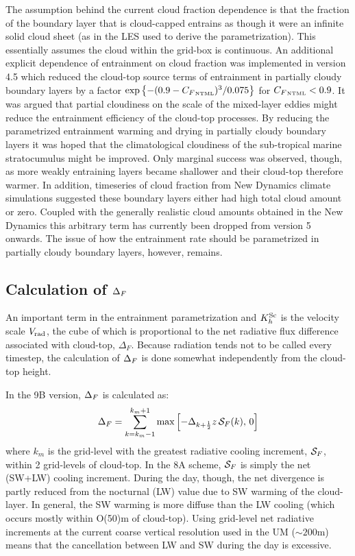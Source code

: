 \documentclass{UMDP_article}
\begin{document}
The assumption behind the current cloud fraction dependence is that
the fraction of the boundary layer that is cloud-capped entrains as
though it were an infinite solid cloud sheet (as in the LES used to
derive the parametrization).  This essentially assumes the cloud
within the grid-box is continuous.  An additional explicit dependence
of entrainment on cloud fraction was implemented in version 4.5 which
reduced the cloud-top source terms of entrainment in partially cloudy
boundary layers by a factor
$\exp{\left\{-(0.9-{C_F}_{\mbox{\tiny \rm NTML}})^3/0.075\right\}}$ for $
{C_F}_{\mbox{\tiny \rm NTML}} < 0.9$.  It was argued that partial cloudiness on the
scale of the mixed-layer eddies might reduce the entrainment
efficiency of the cloud-top processes.  By reducing the parametrized
entrainment warming and drying in partially cloudy boundary layers it
was hoped that the climatological cloudiness of the sub-tropical
marine stratocumulus might be improved.  Only marginal success was
observed, though, as more weakly entraining layers became shallower
and their cloud-top therefore warmer.  In addition, timeseries of
cloud fraction from New Dynamics climate simulations suggested these
boundary layers either had high total cloud amount or zero.  Coupled
with the generally realistic cloud amounts obtained in the New
Dynamics this arbitrary term has currently been dropped from version 5
onwards.  The issue of how the entrainment rate should be parametrized
in partially cloudy boundary layers, however, remains.

\subsection{Calculation of $\Delta_F$}
\label{app:deltaf}

An important term in the entrainment parametrization and $K_h^{\rm Sc}$ is
the velocity scale $V_{\rm rad}$, the cube of which is proportional to the
net radiative flux difference associated with cloud-top, $\Delta_F$.
Because radiation tends not to be called every timestep, the
calculation of $\Delta_F$ is done somewhat independently from the
cloud-top height.

In the 9B version, $\Delta_F$ is calculated as:
\begin{equation}
  \Delta_F = \sum_{k=k_m-1}^{k_m+1} \mbox{max}\left[ 
    - \Delta_{k+\frac{1}{2}} z \, {\cal S}_F(k), \,0 \right]
  \label{ctraddiv}
\end{equation}
where $k_m$ is the grid-level with the greatest radiative cooling
increment, ${\cal S}_F$, within 2 grid-levels of cloud-top.  In
the 8A scheme, ${\cal S}_F$ is simply the net (SW+LW) cooling
increment.  During the day, though, the net divergence is partly
reduced from the nocturnal (LW) value due to SW warming of the
cloud-layer.  In general, the SW warming is more diffuse than the LW
cooling (which occurs mostly within O(50)m of cloud-top).  Using
grid-level net radiative increments at the current coarse vertical
resolution used in the UM ($\sim 200$m) means that the cancellation
between LW and SW during the day is excessive.
\end{document}
